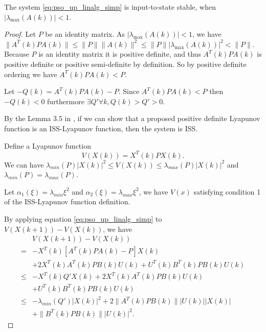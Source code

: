 \begin{mythm}
\label{thm:iss}
The system \eqref{eq:pso_up_linalg_simp} is input-to-state stable, when $ | \lambda_{\max} ( A(k) ) | < 1 $.
\begin{proof}

Let $ P $ be an identity matrix.
As $ | \lambda_{\max} ( A(k) ) | < 1 $, we have
$ \lVert A^{T}(k) P A(k) \rVert \leq \lVert P \rVert \lVert A(k) \rVert^{2} \leq \lVert P \rVert | \lambda_{\max} ( A(k) ) |^{2} < \lVert P \rVert $.
Because $ P $ is an identity matrix it is positive definite, and thus $ A^{T}(k) P A(k) $ is positive definite or positive semi-definite by definition.
So by positive definite ordering we have $ A^{T}(k) P A(k) < P $.

Let $ -Q(k) = A^{T}(k) P A(k) - P $. Since $ A^{T}(k) P A(k) < P $ then $ - Q(k) < 0 $ furthermore $ \exists Q' \forall k, Q(k) > Q' > 0 $. 

By the Lemma 3.5 in \cite{Jiang2001857}, if we can show that a proposed positive definite Lyapunov function is an ISS-Lyapunov function, then the system is ISS.

Define a Lyapunov function
\begin{equation}
\label{eq:lyapunov_v}
V( X(k) ) = X^{T} (k) P X(k).
\end{equation}
We can have
$
\lambda_{min}(P) | X(k) |^{2} \leq V( X(k) )\leq \lambda_{max}(P) | X(k) |^{2}
$ and $ \lambda_{min}(P) = \lambda_{max}(P) $.

Let $ \alpha_{1} ( \xi )= \lambda_{min} \xi^{2} $
and 
$ \alpha_{2} ( \xi )= \lambda_{max} \xi^{2} $,
we have $ V(x) $ satisfying condition 1 of the ISS-Lyapunov function definition.

By applying equation \eqref{eq:pso_up_linalg_simp} to $ V( X(k+1) ) - V( X(k) ) $, we have
\begin{equation}
\label{eq:lyapunov_delta2}
\begin{aligned}
& V( X(k+1) ) - V( X(k) ) \\
= & - X^{T}(k) [ A^{T}(k) P A(k) - P ] X(k)  \\
& + 2 X^{T}(k)  A^{T}(k) P B(k) U(k) + U^{T}(k) B^{T}(k) P B(k) U(k) \\
\leq & - X^{T}(k) Q' X(k) + 2 X^{T}(k)  A^{T}(k) P B(k) U(k) \\
& + U^{T}(k) B^{T}(k) P B(k) U(k) \\
\leq & - \lambda_{min}(Q') | X(k) |^{2} + 2  \lVert A^{T}(k) P B(k) \rVert | U(k) | | X(k) | \\
& + \lVert B^{T}(k) P B(k) \rVert | U(k) |^{2}.
\end{aligned}
\end{equation}


\end{proof}
\end{mythm}

